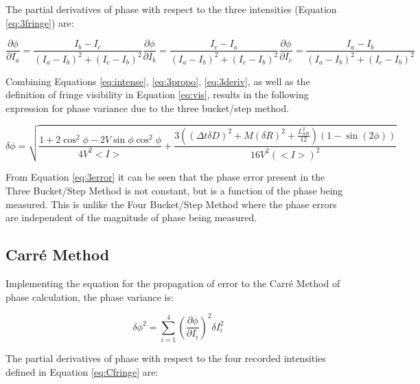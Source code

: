 \documentclass[10pt,letterpaper]{article}
\begin{document}
The partial derivatives of phase with respect to the three intensities (Equation \ref{eq:3fringe}) are:

\begin{subequations}
\label{eq:3deriv}
\begin{equation}
\label{eq:3diffA}
\frac{\partial \phi}{\partial I_a}=\frac{I_b-I_c}{(I_a-I_b)^2+(I_c-I_b)^2}
\end{equation}
\begin{equation}
\label{eq:3diffB}
\frac{\partial \phi}{\partial I_b}=\frac{I_c-I_a}{(I_a-I_b)^2+(I_c-I_b)^2}
\end{equation}
\begin{equation}
\label{eq:3diffC}
\frac{\partial \phi}{\partial I_c}=\frac{I_a-I_b}{(I_a-I_b)^2+(I_c-I_b)^2}
\end{equation}
\end{subequations}

Combining Equations \ref{eq:intense}, \ref{eq:3propo}, \ref{eq:3deriv}, as well as the definition of fringe visibility in Equation \ref{eq:vis}, results in the following expression for phase variance due to the three bucket/step method.

\begin{equation}
\label{eq:3error}
\delta\phi = \sqrt{\frac{1+2\cos^2\phi-2V\sin\phi\cos^2\phi}{4V^2<I>}+\frac{3\left((\Delta t\delta D)^2+M(\delta R)^2+\frac{L_{SB}^2}{12}\right)(1-\sin(2\phi))}{16V^2(<I>)^2}}
\end{equation}

From Equation \ref{eq:3error} it can be seen that the phase error present in the Three Bucket/Step Method is not constant, but is a function of the phase being measured. This is unlike the Four Bucket/Step Method where the phase errors are independent of the magnitude of phase being measured.

\subsection{Carr\'{e} Method}

Implementing the equation for the propagation of error to the Carr\'{e} Method of phase calculation, the phase variance is:

\begin{equation}
\label{eq:Cpropo}
\delta\phi^2=\sum_{i=1}^4\left(\frac{\partial \phi}{\partial I_i}\right)^2\delta I_i^2
\end{equation}

The partial derivatives of phase with respect to the four recorded intensities defined in Equation \ref{eq:Cfringe} are:
\end{document}

